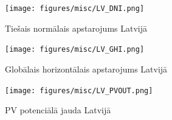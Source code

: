 \begin{figure}[h]
    \centering
    \texttt{[image: figures/misc/LV\_DNI.png]}
    \caption{Tiešais normālais apstarojums Latvijā \cite{solargis}}
    \label{fig:lv_DNI}
\end{figure}
\begin{figure}[h]
    \centering
    \texttt{[image: figures/misc/LV\_GHI.png]}
    \caption{Globālais horizontālais apstarojums Latvijā \cite{solargis}}
    \label{fig:lv_GHI}
\end{figure}
\begin{figure}[t]
    \centering
    \texttt{[image: figures/misc/LV\_PVOUT.png]}
    \caption{PV potenciālā jauda Latvijā \cite{solargis}}
    \label{fig:lv_PVOUT}
\end{figure}